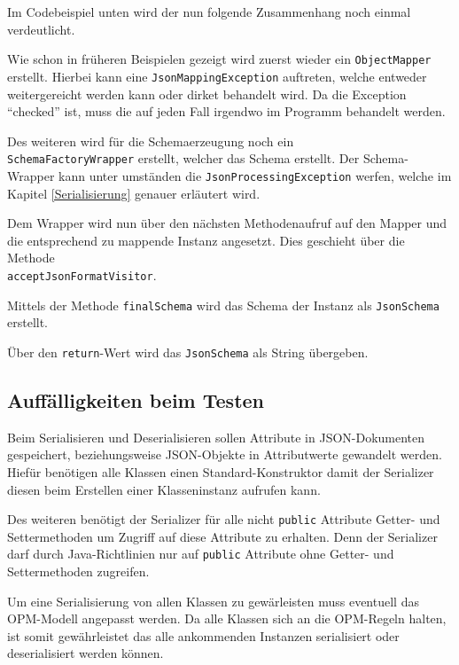 Im Codebeispiel unten wird der nun folgende Zusammenhang noch einmal verdeutlicht.

Wie schon in fr\"uheren Beispielen gezeigt wird zuerst wieder ein \texttt{ObjectMapper} erstellt. Hierbei kann eine \texttt{JsonMappingException} auftreten, welche entweder weitergereicht werden kann oder dirket behandelt wird. Da die Exception "`checked"' ist, muss die auf jeden Fall irgendwo im Programm behandelt werden.

Des weiteren wird f\"ur die Schemaerzeugung noch ein \\\texttt{SchemaFactoryWrapper} erstellt, welcher das Schema erstellt.
Der Schema-Wrapper kann unter umst\"anden die \texttt{JsonProcessingException} werfen, welche im Kapitel \ref{Serialisierung} genauer erl\"autert wird.

Dem Wrapper wird nun \"uber den n\"achsten Methodenaufruf auf den Mapper und die entsprechend zu mappende Instanz angesetzt. Dies geschieht \"uber die Methode \\\texttt{acceptJsonFormatVisitor}.

Mittels der Methode \texttt{finalSchema} wird das Schema der Instanz als \texttt{JsonSchema} erstellt.

\"Uber den \texttt{return}-Wert wird das \texttt{JsonSchema} als String \"ubergeben.



\subsection{Auff\"alligkeiten beim Testen}
Beim Serialisieren und Deserialisieren sollen Attribute in JSON-Dokumenten gespeichert, beziehungsweise JSON-Objekte in Attributwerte gewandelt werden. Hief\"ur ben\"otigen alle Klassen einen Standard-Konstruktor damit der Serializer diesen beim Erstellen einer Klasseninstanz aufrufen kann. 

Des weiteren ben\"otigt der Serializer f\"ur alle nicht \texttt{public} Attribute Getter- und Settermethoden um Zugriff auf diese Attribute zu erhalten. Denn der Serializer darf durch Java-Richtlinien nur auf \texttt{public} Attribute ohne Getter- und Settermethoden zugreifen.

Um eine Serialisierung von allen Klassen zu gew\"arleisten muss eventuell das OPM-Modell angepasst werden.
Da alle Klassen sich an die OPM-Regeln halten, ist somit gew\"ahrleistet das alle ankommenden Instanzen serialisiert oder deserialisiert werden k\"onnen.

